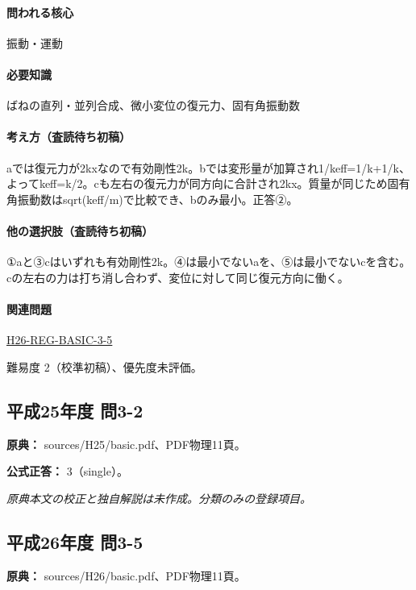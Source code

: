 \paragraph{問われる核心} 振動・運動

\paragraph{必要知識} ばねの直列・並列合成、微小変位の復元力、固有角振動数

\paragraph{考え方（査読待ち初稿）} aでは復元力が2kxなので有効剛性2k。bでは変形量が加算され1/keff=\allowbreak{}1/k+1/k、よってkeff=\allowbreak{}k/2。cも左右の復元力が同方向に合計され2kx。質量が同じため固有角振動数はsqrt(keff/m)で比較でき、bのみ最小。正答②。

\paragraph{他の選択肢（査読待ち初稿）} ①aと③cはいずれも有効剛性2k。④は最小でないaを、⑤は最小でないcを含む。cの左右の力は打ち消し合わず、変位に対して同じ復元方向に働く。

\paragraph{関連問題} \hyperref[q:h26-reg-basic-3-5]{H26-REG-BASIC-3-5}

\par 難易度 2（校準初稿）、優先度未評価。

\subsection{平成25年度 問3-2}
\label{q:h25-reg-basic-3-2}

\noindent\textbf{原典：} sources/H25/basic.pdf、PDF物理11頁。

\textbf{公式正答：} 3（single）。

\par\textit{原典本文の校正と独自解説は未作成。分類のみの登録項目。}

\subsection{平成26年度 問3-5}
\label{q:h26-reg-basic-3-5}

\noindent\textbf{原典：} sources/H26/basic.pdf、PDF物理11頁。

